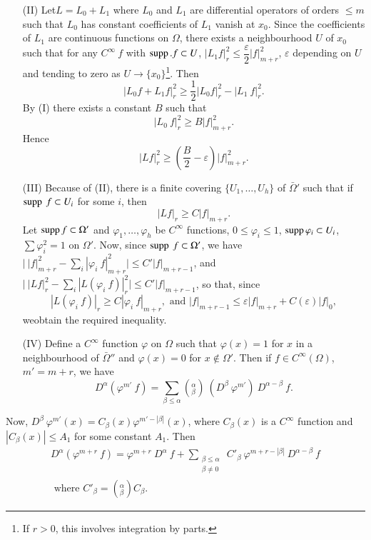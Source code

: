 \begin{enumerate}
\item[(II)] Let\pageoriginale $L = L_0 + L_1$ where $L_0$ and $L_1$ are differential
  operators of orders $\leq m$ such that $L_0$ has constant
  coefficients of $L_1$ vanish at $x_0$. Since the coefficients of
  $L_1$ are continuous functions on $\Omega$, there exists a
  neighbourhood $U$ of $x_0$ such that for any $C^\infty ~ f$ with
  $\operatorname{supp}. f \subset U$, $| L_1 f |^2_r \leq \dfrac{\varepsilon}{2} | f
  |^2_{m+r}$, $\varepsilon$ depending on $U$ and tending to zero as
  $U \rightarrow \{ x_0 \}$\footnote{If $r > 0$, this involves 
    integration by parts.}. Then  
  $$
  | L_0 f + L_1 f |^2_r \geq \frac{1}{2} | L_0 f |^2_r - | L_1 ~ f |^2_r.
  $$
  By (I) there exists a constant $B$ such that 
  $$
  | L_0 ~f|^2_r \geq B | f |^2_{m+r}.
  $$
  Hence
  $$
  | Lf |^2_r \geq ( \frac{B}{2} - \varepsilon ) | f |^2_{m+r}.
  $$
\item[(III)] Because of (II), there is a finite covering $\{ U_1, \ldots
  , U_h \}$ of $\bar{\Omega}'$ such that if $\operatorname{supp} ~ f \subset U_i$
  for some $i$, then  
  $$
  | Lf |_r \geq C | f |_{m+r}.
  $$
  Let $\operatorname{supp} f \subset \Omega'$ and $\varphi_1, \ldots, \varphi_h$ be
  $C^\infty$ functions, $0 \leq \varphi_i \leq 1$, $\operatorname{supp} \varphi_i
  \subset U_i$, $\sum \varphi^2_i = 1$ on $\Omega'$. Now, since $\operatorname{supp}
  ~ f \subset \Omega'$, we have $\big| ~ | f |^2_{m+r} - \sum_i |
  \varphi_i ~f|^2_{m+r} \big| \leq C' | f |_{m+ r -1}$, and $\big| ~ |
  Lf |^2_r - \sum\limits_i | L (\varphi_i ~ f) |^2_r \big| \leq C' | f
  |_{m+r-1}$, so that, since 
  $$
  | L (\varphi_i ~ f) |_r \geq C | \varphi_i ~ f |_{m+r}, \text{ and }
  | f |_{m+r-1} \leq \varepsilon | f |_{m+r} + C(\varepsilon) | f |_0, 
  $$
  we\pageoriginale obtain the required inequality.
\item[(IV)] Define a $C^\infty$ function $\varphi$ on $\Omega$ such
  that $\varphi(x) = 1$ for $x$ in a neighbourhood of $\bar{\Omega}''$
  and $\varphi (x) = 0$ for $x \notin  \Omega'$. Then if $f \in
  C^\infty (\Omega )$, $m' = m + r$, we have 
  $$
  D^\alpha (\varphi^{m'} ~ f) = \sum_{\beta \leq \alpha} ( ^\alpha
  _{\beta}) ~ (D^\beta ~ \varphi^{m'}) ~ D^{\alpha - \beta} ~ f. 
  $$
\end{enumerate}

Now, $D^\beta ~ \varphi^{m'} (x) = C_\beta (x) \varphi^{m' - | \beta
  |} (x)$, where $C_\beta (x)$ is a $C^\infty$ function and $| C_\beta
(x) | \leq A_1$ for some constant $A_1$. Then  
\begin{gather*}
  D^\alpha (\varphi^{m+r} ~ f) = \varphi^{m+r} ~ D^\alpha ~ f +
  \sum_{\substack{\beta \leq \alpha\\ \beta \neq 0}} ~ C'_\beta ~
  \varphi^{m+r - | \beta | } ~ D^{\alpha - \beta } ~ f\\ 
  \text{ where } C'_\beta = ( ^\alpha _{\beta}) C_\beta .
\end{gather*}

